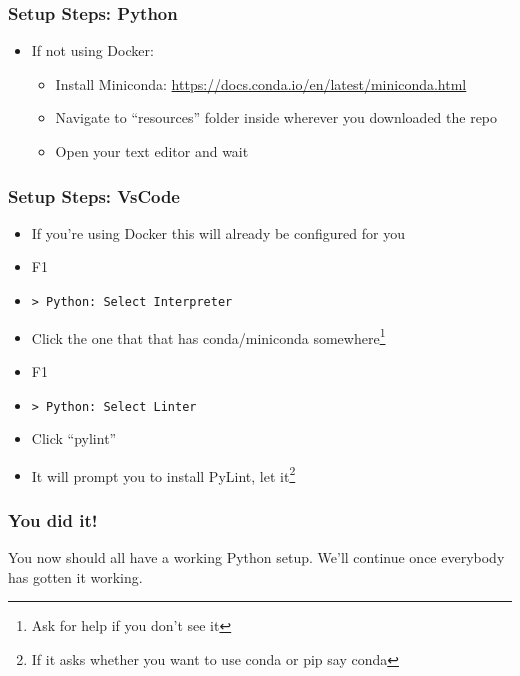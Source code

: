 \documentclass{beamer}
\begin{document}
\begin{frame}
  \frametitle{Setup Steps: Python}

  \begin{itemize}
    \item If not using Docker:
      \begin{itemize}
        \item Install Miniconda: \url{https://docs.conda.io/en/latest/miniconda.html}
        \item Navigate to ``resources'' folder inside wherever you downloaded
              the repo
        \item Open your text editor and wait
      \end{itemize}
  \end{itemize}
\end{frame}
\begin{frame}
  \frametitle{Setup Steps: VsCode}
  \begin{itemize}
    \item If you're using Docker this will already be configured for you
    \item F1
    \item \texttt{> Python: Select Interpreter}
    \item Click the one that that has conda/miniconda somewhere\footnote{Ask for help if you don't see it}
    \item F1
    \item \texttt{> Python: Select Linter}
    \item Click ``pylint''
    \item It will prompt you to install PyLint, let it\footnote{If it asks
          whether you want to use conda or pip say conda}
  \end{itemize}
\end{frame}
\begin{frame}
  \frametitle{You did it!}
  You now should all have a working Python setup.  We'll continue once
  everybody has gotten it working.
\end{frame}
\end{document}
